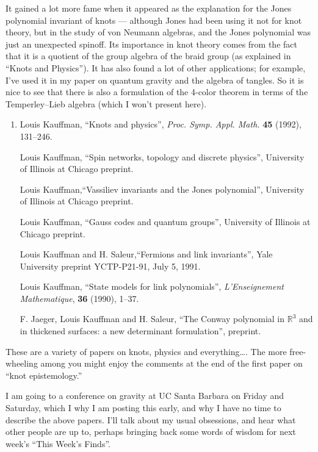\documentclass[12pt]{article}
\begin{document}
It gained a lot more fame when it appeared as the explanation for the
Jones polynomial invariant of knots --- although Jones had been using it
not for knot theory, but in the study of von Neumann algebras, and the
Jones polynomial was just an unexpected spinoff. Its importance in knot
theory comes from the fact that it is a quotient of the group algebra of
the braid group (as explained in ``Knots and Physics''). It has also
found a lot of other applications; for example, I've used it in my paper
on quantum gravity and the algebra of tangles. So it is nice to see that
there is also a formulation of the 4-color theorem in terms of the
Temperley--Lieb algebra (which I won't present here).

\begin{enumerate}
\def\labelenumi{\arabic{enumi})}
\setcounter{enumi}{4}
\item
  Louis Kauffman, ``Knots and physics'', \emph{Proc. Symp. Appl.
  Math.} \textbf{45} (1992), 131--246.

   Louis Kauffman, ``Spin networks, topology and discrete physics'',
  University of Illinois at Chicago preprint.

   Louis Kauffman,``Vassiliev invariants and the Jones polynomial'',
  University of Illinois at Chicago preprint.

  Louis Kauffman, ``Gauss codes and quantum groups'', University of
  Illinois at Chicago preprint.

   Louis Kauffman and H. Saleur,``Fermions and link invariants'',
  Yale University preprint YCTP-P21-91, July 5, 1991.

  Louis Kauffman, ``State models for link polynomials'',
  \emph{L'Enseignement Mathematique}, \textbf{36} (1990), 1--37.

  F. Jaeger, Louis Kauffman and H.
  Saleur, ``The Conway polynomial in \(\mathbb{R}^3\) and in thickened surfaces: a
  new determinant formulation'', preprint.
\end{enumerate}

These are a variety of papers on knots, physics and everything\ldots.
The more free-wheeling among you might enjoy the comments at the end of
the first paper on ``knot epistemology.''

I am going to a conference on gravity at UC Santa Barbara on Friday and
Saturday, which I why I am posting this early, and why I have no time to
describe the above papers. I'll talk about my usual obsessions, and hear
what other people are up to, perhaps bringing back some words of wisdom
for next week's ``This Week's Finds''.
\end{document}
